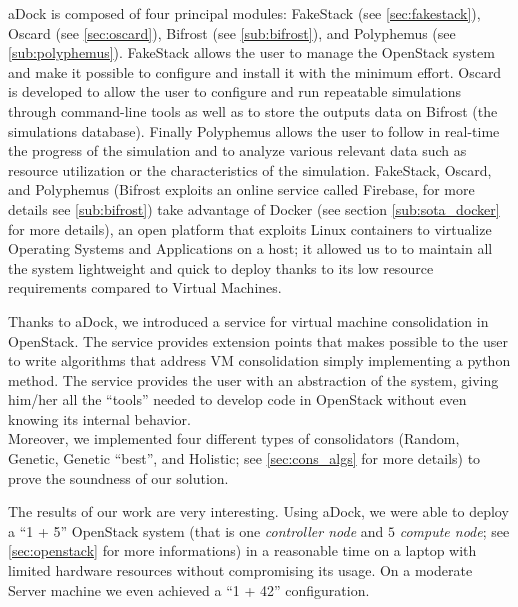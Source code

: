 aDock is composed of four principal modules: FakeStack (see \ref{sec:fakestack}), Oscard (see \ref{sec:oscard}), Bifrost (see \ref{sub:bifrost}), and Polyphemus (see \ref{sub:polyphemus}).
FakeStack allows the user to manage the OpenStack system and make it possible to configure and install it with the minimum effort. Oscard is developed to allow the user to configure and run repeatable simulations through command-line tools as well as to store the outputs data on Bifrost (the simulations database).
Finally Polyphemus allows the user to follow in real-time the progress of the simulation and to analyze various relevant data such as resource utilization or the characteristics of the simulation.
FakeStack, Oscard, and Polyphemus (Bifrost exploits an online service called Firebase, for more details see \ref{sub:bifrost}) take advantage of Docker (see section \ref{sub:sota_docker} for more details), an open platform that exploits Linux containers to virtualize Operating Systems and Applications on a host; it allowed us to to maintain all the system lightweight and quick to deploy thanks to its low resource requirements compared to Virtual Machines.

Thanks to aDock, we introduced a service for virtual machine consolidation in OpenStack. The service provides extension points that makes possible to the user to write algorithms that address VM consolidation simply implementing a python method. The service provides the user with an abstraction of the system, giving him/her all the ``tools'' needed to develop code in OpenStack without even knowing its internal behavior.\\
Moreover, we implemented four different types of consolidators (Random, Genetic, Genetic ``best'', and Holistic; see \ref{sec:cons_algs} for more details) to prove the soundness of our solution.

The results of our work are very interesting. Using aDock, we were able to deploy a ``1 + 5'' OpenStack system (that is one \textit{controller node} and $5$ \textit{compute node}; see \ref{sec:openstack} for more informations) in a reasonable time on a laptop with limited hardware resources without compromising its usage. On a moderate Server machine we even achieved a ``1 + 42'' configuration.
